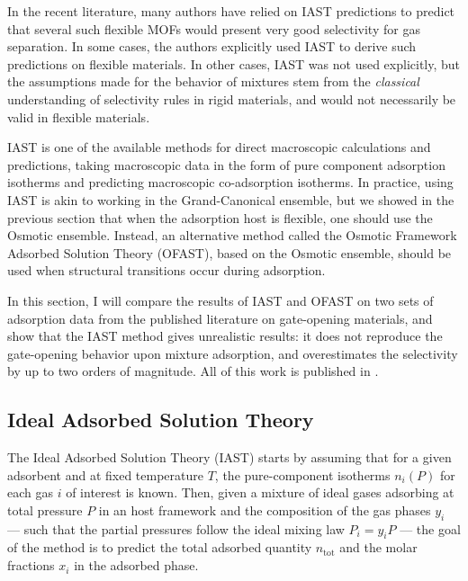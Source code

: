 \documentclass[thesis]{subfiles}
\begin{document}
In the recent literature, many authors have relied on IAST predictions to
predict that several such flexible MOFs would present very good selectivity for
gas separation. In some cases, the authors explicitly used IAST to derive such
predictions on flexible materials\cite{Banerjee2014, Mukherjee2015, Foo2016,
Li2016}. In other cases, IAST was not used explicitly, but the assumptions made
for the behavior of mixtures stem from the \emph{classical} understanding of
selectivity rules in rigid materials, and would not necessarily be valid in
flexible materials\cite{Gucuyener2010, Inubushi2010, Nijem2012, Sanda2013,
Joarder2014, Mukherjee2014}.

IAST is one of the available methods for direct macroscopic calculations and
predictions, taking macroscopic data in the form of pure component adsorption
isotherms and predicting macroscopic co-adsorption isotherms. In practice, using
IAST is akin to working in the Grand-Canonical ensemble, but we showed in the
previous section that when the adsorption host is flexible, one should use the
Osmotic ensemble. Instead, an alternative method called the Osmotic Framework
Adsorbed Solution Theory (OFAST)\cite{Coudert2009}, based on the Osmotic
ensemble, should be used when structural transitions occur during adsorption.


In this section, I will compare the results of IAST and OFAST on two sets of
adsorption data from the published literature on gate-opening materials, and
show that the IAST method gives unrealistic results: it does not reproduce the
gate-opening behavior upon mixture adsorption, and overestimates the selectivity
by up to two orders of magnitude. All of this work is published in
\cite{Fraux2018}.

\subsection{Ideal Adsorbed Solution Theory}

The Ideal Adsorbed Solution Theory (IAST) starts by assuming that for a given
adsorbent and at fixed temperature $T$, the pure-component isotherms $n_i(P)$
for each gas $i$ of interest is known. Then, given a mixture of ideal gases
adsorbing at total pressure $P$ in an host framework and the composition of the
gas phases $y_i$ --- such that the partial pressures follow the ideal mixing law
$P_i = y_i P$ --- the goal of the method is to predict the total adsorbed
quantity $n_\text{tot}$ and the molar fractions $x_i$ in the adsorbed phase.
\end{document}
